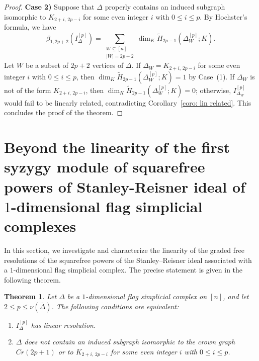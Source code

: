 \documentclass[12pt]{amsart}
\newtheorem{Theorem}{Theorem}[section]
\begin{document}
\begin{proof}
\textbf{Case 2)} Suppose that $\Delta$ properly contains an induced subgraph isomorphic to
$K_{2+i,\,2p-i}$ for some even integer $i$ with $0 \leq i \leq p$. By Hochster’s formula, we have
\[
\beta_{1,2p+2}(I_{\Delta}^{[p]}) =
\sum_{\substack{W \subseteq [n] \\ |W| = 2p+2}}
\dim_K \widetilde{H}_{2p-1}(\Delta_W^{[p]}; K).
\]
Let $W$ be a subset of $2p+2$ vertices of $\Delta$.
If $\Delta_W= K_{2+i,\,2p-i}$ for some even integer $i$ with $0 \leq i \leq p$,
then $\dim_K \widetilde{H}_{2p-1}(\Delta_W^{[p]}; K)=1$ by Case~(1).
If $\Delta_W$ is not of the form $K_{2+i,\,2p-i}$, then
$\dim_K \widetilde{H}_{2p-1}(\Delta_W^{[p]}; K)=0$; otherwise,
$I_{\Delta_W}^{[p]}$ would fail to be linearly related, contradicting
Corollary~\ref{coro: lin related}.
This concludes the proof of the theorem.
\end{proof}


\section{Beyond the linearity of the first syzygy module of squarefree powers of Stanley-Reisner ideal of $1$-dimensional flag simplicial complexes}\label{sec: linearity simpl complex}

In this section, we investigate and characterize the linearity of the graded free resolutions of the squarefree powers of the Stanley--Reisner ideal associated with a $1$-dimensional flag simplicial complex. The precise statement is given in the following theorem.

 

\begin{Theorem}\label{Thm: characterization linear resolution} Let $\Delta$ be a $1$-dimensional flag simplicial complex on $[n]$, and let $2 \leq p \leq \nu(\overline{\Delta})$. The following conditions are equivalent: 
\begin{enumerate} 
\item $I_{\Delta}^{[p]}$ has linear resolution. 
\item $\Delta$ does not contain an induced subgraph isomorphic to the crown graph $Cr(2p+1)$ or to $K_{2+i,\,2p-i}$ for some even integer $i$ with $0 \leq i \leq p$. 
\end{enumerate} 
\end{Theorem}
\end{document}
